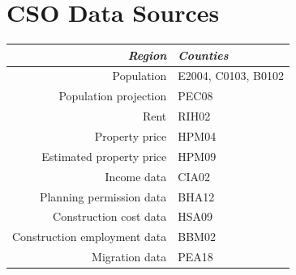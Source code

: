 \documentclass[twocolumn]{article}
\begin{document}
\section{CSO Data Sources\label{a:sources}}
\begin{tabularx}{0.5\textwidth}{r X}
    \textit{Region} & \textit{Counties} \\ \hline
    Population & E2004, C0103, B0102 \\ \hline
    Population projection & PEC08 \\ \hline
    Rent & RIH02 \\ \hline
    Property price & HPM04  \\ \hline
    Estimated property price & HPM09 \\ \hline
    Income data & CIA02 \\ \hline
    Planning permission data & BHA12 \\ \hline
    Construction cost data & HSA09 \\ \hline
    Construction employment data & BBM02 \\ \hline
    Migration data & PEA18
\end{tabularx}
\newpage
\end{document}
